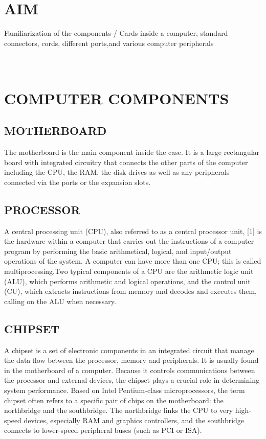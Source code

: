 

	
	\section*{ AIM }
	
	Familiarization of the components / Cards inside a computer, standard connectors, cords, different ports,and various computer peripherals\\
	
  	\section*{\textbf{\\COMPUTER COMPONENTS}}
  		
		\subsection*{MOTHERBOARD}
	The motherboard is the main component inside the case. It is a large rectangular board with integrated circuitry
	that connects the other parts of the computer including the CPU, the RAM, the disk drives as well as any peripherals 	connected via the ports or the expansion slots.
		\subsection*{PROCESSOR}
	A central processing unit (CPU), also referred to as a central processor unit,
	[1] is the hardware within
	a computer that carries out the instructions of a computer program by performing the basic arithmetical, logical,
	and input/output operations of the system. A computer can have more than one CPU; this is
	called multiprocessing.Two typical components of a CPU are the arithmetic logic unit (ALU), which
	performs arithmetic and logical operations, and the control unit (CU), which extracts instructions
	from memory and decodes and executes them, calling on the ALU when necessary.
		\subsection*{CHIPSET}
	A chipset is a set of electronic components in an integrated circuit that manage the data flow between the
	processor, memory and peripherals. It is usually found in the motherboard of a computer. Because it controls 			communications between the
	processor and external devices, the chipset plays a crucial role in determining system performance. Based
	on Intel Pentium-class microprocessors, the term chipset often refers to a specific pair of chips on the
	motherboard: the northbridge and the southbridge. The northbridge links the CPU to very high-speed devices,
	especially RAM and graphics controllers, and the southbridge connects to lower-speed peripheral buses (such
	as PCI or ISA). 
